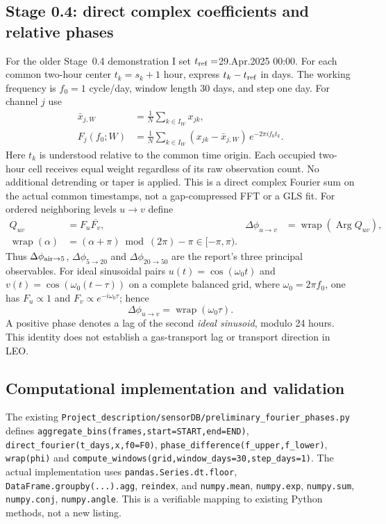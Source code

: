 \documentclass[11pt,letterpaper]{article}
\newcommand{\wrap}{\operatorname{wrap}}
\begin{document}
\subsection{Stage 0.4: direct complex coefficients and relative phases}
\label{sec:fourier}
For the older Stage~0.4 demonstration I set $t_{\rm ref}=$29.Apr.2025 00:00. For each common two-hour center $t_k=s_k+1$ hour, express $t_k-t_{\rm ref}$ in days. The working frequency is $f_0=1$ cycle/day, window length 30 days, and step one day. For channel $j$ use
\begin{align}
\bar x_{j,W}&=\frac1N\sum_{k\in I_W}x_{jk},\\
F_j(f_0;W)&=\frac1N\sum_{k\in I_W}(x_{jk}-\bar x_{j,W})\,e^{-2\pi i f_0 t_k}.
\label{eq:fourier}
\end{align}
Here $t_k$ is understood relative to the common time origin. Each occupied two-hour cell receives equal weight regardless of its raw observation count. No additional detrending or taper is applied. This is a direct complex Fourier sum on the actual common timestamps, not a gap-compressed FFT or a GLS fit.
For ordered neighboring levels $u\to v$ define
\begin{align}
Q_{uv}&=F_u\overline{F_v},&
\Delta\phi_{u\to v}&=\wrap(\operatorname{Arg}Q_{uv}),\\
\wrap(\alpha)&=(\alpha+\pi)\bmod(2\pi)-\pi\in[-\pi,\pi).
\label{eq:phase}
\end{align}
Thus $\Delta\phi_{\rm air\to5}$, $\Delta\phi_{5\to20}$ and $\Delta\phi_{20\to50}$ are the report's three principal observables. For ideal sinusoidal pairs $u(t)=\cos(\omega_0t)$ and $v(t)=\cos(\omega_0(t-\tau))$ on a complete balanced grid, where $\omega_0=2\pi f_0$, one has $F_u\propto1$ and $F_v\propto e^{-i\omega_0\tau}$; hence
\begin{equation}
\Delta\phi_{u\to v}=\wrap(\omega_0\tau).
\end{equation}
A positive phase denotes a lag of the second \emph{ideal sinusoid}, modulo 24 hours. This identity does not establish a gas-transport lag or transport direction in LEO.

\subsection{Computational implementation and validation}
The existing \texttt{Project\_description/sensorDB/preliminary\_fourier\_phases.py} defines \texttt{aggregate\_bins(frames,start=START,end=END)}, \texttt{direct\_fourier(t\_days,x,f0=F0)}, \texttt{phase\_difference(f\_upper,f\_lower)}, \texttt{wrap(phi)} and \texttt{compute\_windows(grid,window\_days=30,step\_days=1)}. The actual implementation uses \texttt{pandas.Series.dt.floor}, \texttt{DataFrame.groupby(...).agg}, \texttt{reindex}, and \texttt{numpy.mean}, \texttt{numpy.exp}, \texttt{numpy.sum}, \texttt{numpy.conj}, \texttt{numpy.angle}. This is a verifiable mapping to existing Python methods, not a new listing.
\end{document}
